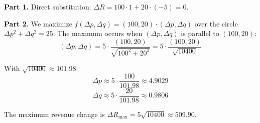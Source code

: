 \documentclass{ximera}
\begin{document}
\begin{solution}
\textbf{Part 1.} Direct substitution: \(\Delta R = 100 \cdot 1 + 20 \cdot (-5) = 0.\)

\textbf{Part 2.} We maximize \(f(\Delta p,\Delta q) = (100,20)\cdot(\Delta p,\Delta q)\) over the circle \(\Delta p^2+\Delta q^2=25\). The maximum occurs when \((\Delta p,\Delta q)\) is parallel to \((100,20)\):
\[
(\Delta p,\Delta q) = 5 \cdot \frac{(100,20)}{\sqrt{100^2 + 20^2}} = 5 \cdot \frac{(100,20)}{\sqrt{10400}}
\]

With \(\sqrt{10400} \approx 101.98\):
\[
\Delta p \approx 5 \cdot \frac{100}{101.98} \approx 4.9029
\]
\[
\Delta q \approx 5 \cdot \frac{20}{101.98} \approx 0.9806
\]

The maximum revenue change is \(\Delta R_{\max} = 5\sqrt{10400} \approx 509.90\).
\end{solution}
\end{document}
